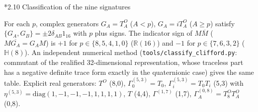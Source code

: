 \documentclass[10pt,a4paper]{article}
\makeatletter
\renewcommand\subsection{\@startsection{subsection}{2}{\z@}{-3.25ex\@plus -1ex \@minus -.2ex}{1.5ex \@plus .2ex}{\normalfont\large\bfseries\raggedright}}
\makeatother
\begin{document}
\subsection*{2.10 Classification of the nine signatures}
For each $p$, complex generators $G_A=T^{O}_A$ ($A<p$), $G_A=iT^{O}_A$ ($A\ge p$) satisfy $\lbrace G_A,G_B\rbrace=\pm2\delta_{AB}1_{16}$ with $p$ plus signs. The indicator sign of $M\overline M$ ($M\overline{G_A}=G_AM$) is $+1$ for $p\in\lbrace8,5,4,1,0\rbrace$ ($\mathbb R(16)$) and $-1$ for $p\in\lbrace7,6,3,2\rbrace$ ($\mathbb H(8)$). An independent numerical method (\texttt{tools/\allowbreak{}classify\_\allowbreak{}clifford.py}: commutant of the realified 32-dimensional representation, whose traceless part has a negative definite trace form exactly in the quaternionic case) gives the same table. Explicit real generators: $T^{O}$ (8,0), $\Gamma^{(5,3)}_0=T_0$, $\Gamma^{(5,3)}_i=T_0T_i$ (5,3) with $\eta^{(5,3)}=\mathrm{diag}(1,-1,-1,-1,1,1,1,1)$, $T$ (4,4), $\Gamma^{(1,7)}$ (1,7), $\Gamma^{(0,8)}_A=T^{O}_8T^{O}_A$ (0,8).
\end{document}
